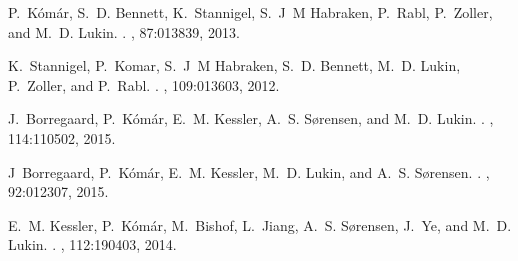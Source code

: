 
{ 
\ssp %
  

}

{ 
\ssp %
\begin{thebibliography}{1}


P.~K\'{o}m\'{a}r, 
S.~D. Bennett, 
K.~Stannigel, 
S.~J~M Habraken, 
P.~Rabl,
P.~Zoller, 
and M.~D. Lukin.
.
,
87:013839, 2013.



K.~Stannigel, 
P.~Komar, 
S.~J~M Habraken, 
S.~D. Bennett, 
M.~D. Lukin, 
P.~Zoller,
and P.~Rabl.
.
, 
109:013603, 2012.



J.~Borregaard, 
P.~K\'{o}m\'{a}r, 
E.~M. Kessler, 
A.~S. S{\o}rensen, 
and M.~D. Lukin.
.
, 
114:110502, 2015.


J~Borregaard, 
P.~K\'{o}m\'{a}r, 
E.~M. Kessler, 
M.~D. Lukin, 
and A.~S. S{\o}rensen.
.
, 
92:012307, 2015.


E.~M. Kessler, 
P.~K\'{o}m\'{a}r, 
M.~Bishof, 
L.~Jiang, 
A.~S. S{\o}rensen, 
J.~Ye,
and M.~D. Lukin.
.
, 
112:190403, 2014.


\end{thebibliography}}
